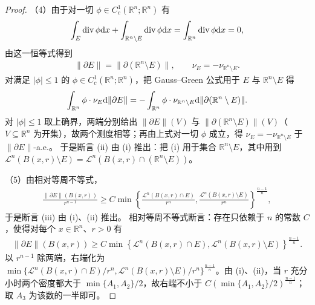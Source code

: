 \documentclass[../../main.tex]{subfiles}%
\begin{document}
\begin{proof}
（4）由于对一切 $\phi\in C_c^1(\mathbb{R}^n;\mathbb{R}^n)$ 有
\begin{align*}
\int_E\operatorname{div}\phi\mathrm{d} x+\int_{\mathbb{R}^n\setminus E}\operatorname{div}\phi\mathrm{d} x=\int_{\mathbb{R}^n}\operatorname{div}\phi\mathrm{d} x=0,
\end{align*}
由这一恒等式得到
\begin{align*}
\lVert\partial E\rVert=\lVert\partial(\mathbb{R}^n\setminus E)\rVert,\qquad\nu_E=-\nu_{\mathbb{R}^n\setminus E}.
\end{align*}
对满足 $\lvert\phi\rvert\leqslant1$ 的 $\phi\in C_c^1(\mathbb{R}^n;\mathbb{R}^n)$，把 Gauss--Green 公式用于 $E$ 与 $\mathbb{R}^n\setminus E$ 得
\begin{align*}
\int_{\mathbb{R}^n}\phi\cdot\nu_E\mathrm{d}\lVert\partial E\rVert=-\int_{\mathbb{R}^n}\phi\cdot\nu_{\mathbb{R}^n\setminus E}\mathrm{d}\lVert\partial(\mathbb{R}^n\setminus E)\rVert .
\end{align*}
对 $\lvert\phi\rvert\leqslant1$ 取上确界，两端分别给出 $\lVert\partial E\rVert(V)$ 与 $\lVert\partial(\mathbb{R}^n\setminus E)\rVert(V)$（$V\subseteq\mathbb{R}^n$ 为开集），故两个测度相等；再由上式对一切 $\phi$ 成立，得 $\nu_E=-\nu_{\mathbb{R}^n\setminus E}$ 于 $\lVert\partial E\rVert$-a.e.。
于是断言 (ii) 由 (i) 推出：把 (i) 用于集合 $\mathbb{R}^n\setminus E$，其中用到 $\mathcal{L}^n(B(x,r)\setminus E)=\mathcal{L}^n(B(x,r)\cap(\mathbb{R}^n\setminus E))$。

（5）由相对等周不等式，
\begin{align*}
\frac{\lVert\partial E\rVert(B(x,r))}{r^{n-1}}
\geqslant C\min\left\{\frac{\mathcal{L}^n(B(x,r)\cap E)}{r^n},\frac{\mathcal{L}^n(B(x,r)\setminus E)}{r^n}\right\}^{\frac{n-1}{n}},
\end{align*}
于是断言 (iii) 由 (i)、(ii) 推出。
相对等周不等式断言：存在只依赖于 $n$ 的常数 $C$，使得对每个 $x\in\mathbb{R}^n$、$r>0$ 有
\begin{align*}
\lVert\partial E\rVert(B(x,r))\geqslant C\min\left\{\mathcal{L}^n(B(x,r)\cap E),\mathcal{L}^n(B(x,r)\setminus E)\right\}^{\frac{n-1}{n}} .
\end{align*}
以 $r^{n-1}$ 除两端，右端化为 $\min\{\mathcal{L}^n(B(x,r)\cap E)/r^n,\mathcal{L}^n(B(x,r)\setminus E)/r^n\}^{\frac{n-1}{n}}$。由 (i)、(ii)，当 $r$ 充分小时两个密度都大于 $\min\{A_1,A_2\}/2$，故右端不小于 $C(\min\{A_1,A_2\}/2)^{\frac{n-1}{n}}$；取 $A_3$ 为该数的一半即可。


\end{proof}
\end{document}
